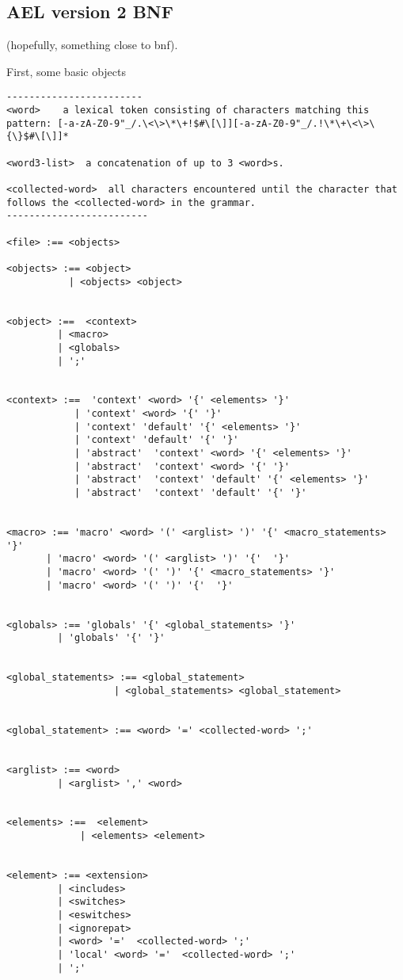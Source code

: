 {\subsection{AEL version 2 BNF}

(hopefully, something close to bnf).

First, some basic objects

\begin{astlisting}
\begin{verbatim}
------------------------
<word>    a lexical token consisting of characters matching this pattern: [-a-zA-Z0-9"_/.\<\>\*\+!$#\[\]][-a-zA-Z0-9"_/.!\*\+\<\>\{\}$#\[\]]*

<word3-list>  a concatenation of up to 3 <word>s.

<collected-word>  all characters encountered until the character that follows the <collected-word> in the grammar.
-------------------------

<file> :== <objects>

<objects> :== <object>
           | <objects> <object>


<object> :==  <context>
         | <macro>
         | <globals>
         | ';'


<context> :==  'context' <word> '{' <elements> '}'
            | 'context' <word> '{' '}'
            | 'context' 'default' '{' <elements> '}'
            | 'context' 'default' '{' '}'
            | 'abstract'  'context' <word> '{' <elements> '}'
            | 'abstract'  'context' <word> '{' '}'
            | 'abstract'  'context' 'default' '{' <elements> '}'
            | 'abstract'  'context' 'default' '{' '}'


<macro> :== 'macro' <word> '(' <arglist> ')' '{' <macro_statements> '}'
       | 'macro' <word> '(' <arglist> ')' '{'  '}'
       | 'macro' <word> '(' ')' '{' <macro_statements> '}'
       | 'macro' <word> '(' ')' '{'  '}'


<globals> :== 'globals' '{' <global_statements> '}'
         | 'globals' '{' '}'


<global_statements> :== <global_statement>
                   | <global_statements> <global_statement>


<global_statement> :== <word> '=' <collected-word> ';'


<arglist> :== <word>
         | <arglist> ',' <word>


<elements> :==  <element>
             | <elements> <element>


<element> :== <extension>
         | <includes>
         | <switches>
         | <eswitches>
         | <ignorepat>
         | <word> '='  <collected-word> ';'
         | 'local' <word> '='  <collected-word> ';'
         | ';'



\end{verbatim}
\end{astlisting}}
